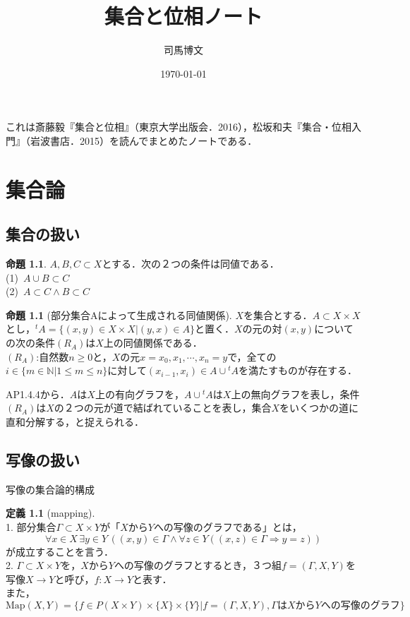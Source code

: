 \documentclass[uplatex, 12pt, dvipdfmx]{jsreport}
\title{集合と位相ノート}
\author{司馬博文}
\date{\today}
\theoremstyle{definition}
\newtheorem{proposition}[theorem]{命題}
\newtheorem{definition}[theorem]{定義}
\theoremstyle{StatementsWithStar}
\theoremstyle{StatementsWithStar2}
\theoremstyle{StatementsWithStar3}
\theoremstyle{StatementsWithCCirc}
\theoremstyle{definition}
\begin{document}
\tableofcontents
\vspace{1cm}
これは斎藤毅『集合と位相』（東京大学出版会．2016），松坂和夫『集合・位相入門』（岩波書店．2015）を読んでまとめたノートである．
\chapter{集合論}

\section{集合の扱い}

\begin{proposition}$A,B,C\subset X$とする．次の２つの条件は同値である．\rm{}\\
    (1)\, $A\cup B\subset C$ \\
    (2)\, $A\subset C\wedge B\subset C$
\end{proposition}

\begin{proposition}[部分集合Aによって生成される同値関係]
    $X$を集合とする．$A\subset X\times X$とし，${}^t\!A=\{ (x,y)\in X\times X|(y,x)\in A\}$と置く．$X$の元の対$(x,y)$についての次の条件$(R_A)$は$X$上の同値関係である．\\
    $(R_A)$:自然数$n\ge 0$と，$X$の元$x=x_0,x_1,\cdots,x_n=y$で，全ての$i\in \{ m\in\mathbb{N} | 1\le m\le n \}$に対して$(x_{i-1},x_i)\in A\cup {}^t\!A$を満たすものが存在する．
\end{proposition}
AP1.4.4から．$A$は$X$上の有向グラフを，$A\cup {}^t\!A$は$X$上の無向グラフを表し，条件$(R_A)$は$X$の２つの元が道で結ばれていることを表し，集合$X$をいくつかの道に直和分解する，と捉えられる．

\section{写像の扱い}

\begin{itembox}[l]{写像の集合論的構成}
	\begin{definition}[mapping]\rm{}　\\
		1. 部分集合$\Gamma\subset X\times Y$が「$X$から$Y$への写像のグラフである」とは，$$\forall x\in X\, \exists y\in Y \, ((x,y)\in\Gamma\wedge \forall z\in Y((x,z)\in\Gamma\Rightarrow y=z))$$が成立することを言う．\\
        2. $\Gamma\subset X\times Y$を，$X$から$Y$への写像のグラフとするとき，３つ組$f=(\Gamma,X,Y)$を写像$X\to Y$と呼び，$f:X\to Y$と表す．\\
        また，$$\mathrm{Map}(X,Y)=\{ f\in P(X\times Y)\times \{ X\}\times\{ Y\} | f=(\Gamma,X,Y), \Gamma はXからYへの写像のグラフ \} $$
	\end{definition}
\end{itembox}
\end{document}
